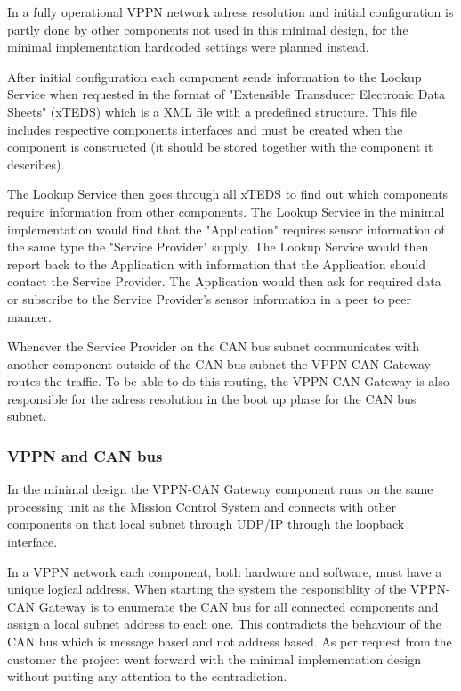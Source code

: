 In a fully operational VPPN network adress resolution and initial
configuration is partly done by other components not used in this minimal
design, for the minimal implementation hardcoded settings were planned instead.

After initial configuration each component sends information to the
Lookup Service when requested in the format of "Extensible Transducer Electronic Data Sheets"
(xTEDS) which is a XML file with a predefined structure. This file includes
respective components interfaces and must be created when the component is
constructed (it should be stored together with the component it describes).

The Lookup Service then goes through all xTEDS to find out which components
require information from other components. The Lookup Service in the minimal
implementation would find that the "Application" requires sensor information of
the same type the "Service Provider" supply. The Lookup Service would then report
back to the Application with information that the Application should contact
the Service Provider. The Application would then ask for required data or
subscribe to the Service Provider's sensor information in a peer to peer manner.

Whenever the Service Provider on the CAN bus subnet communicates with another
component outside of the CAN bus subnet the VPPN-CAN Gateway routes the traffic.
To be able to do this routing, the VPPN-CAN Gateway is also
responsible for the adress resolution in the boot up phase for the CAN bus
subnet.

\subsubsection{VPPN and CAN bus}\label{subsubsec:vppn_can_bus}
In the minimal design the VPPN-CAN Gateway component runs on the same
processing unit as the Mission Control System and connects with other
components on that local subnet through UDP/IP through the loopback interface.

In a VPPN network each component, both hardware and software, must have a unique
logical address. When starting the system the responsiblity of the VPPN-CAN Gateway is to
enumerate the CAN bus for all connected components and assign a local subnet address to
each one. This contradicts the behaviour of the CAN bus which is message based
and not address based. As per request from the customer the project went
forward with the minimal implementation design without putting any attention to
the contradiction.

